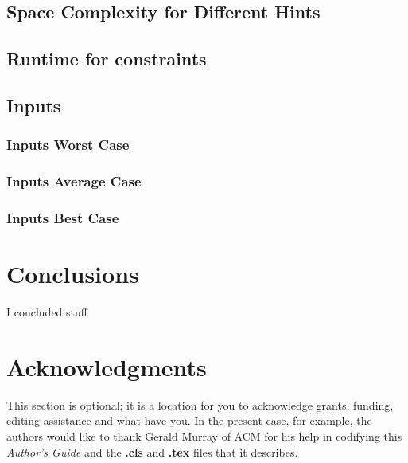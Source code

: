 \documentclass{sig-alternate}
\begin{document}
\subsection{Space Complexity for Different Hints}

\subsection{Runtime for constraints}

\subsection{Inputs} 
\subsubsection{Inputs Worst Case}
\subsubsection{Inputs Average Case}
\subsubsection{Inputs Best Case}

 
\section{Conclusions}
I concluded stuff

\section{Acknowledgments}
This section is optional; it is a location for you
to acknowledge grants, funding, editing assistance and
what have you.  In the present case, for example, the
authors would like to thank Gerald Murray of ACM for
his help in codifying this \textit{Author's Guide}
and the \textbf{.cls} and \textbf{.tex} files that it describes.

%
\cite{*}

%
%
\end{document}
